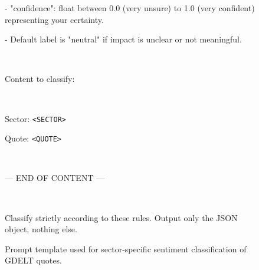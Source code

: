 \begin{figure}[H]
\begin{tcolorbox}
- "confidence": float between 0.0 (very unsure) to 1.0 (very confident) representing your certainty.

- Default label is "neutral" if impact is unclear or not meaningful.

$\ $

Content to classify:

$\ $

Sector: \texttt{<SECTOR>}

Quote: \texttt{<QUOTE>}

$\ $

--- END OF CONTENT ---

$\ $

Classify strictly according to these rules. Output only the JSON object, nothing else.
\end{tcolorbox}
\caption{Prompt template used for sector-specific sentiment classification of GDELT quotes.}
\label{fig:GDELT_prompt}
\end{figure}



